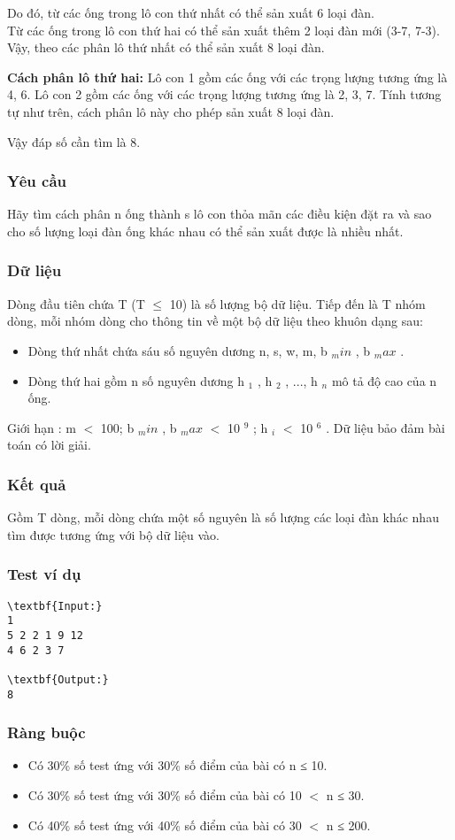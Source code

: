 Do đó, từ các ống trong lô con thứ nhất có thể sản xuất 6 loại đàn.
\\Từ các ống trong lô con thứ hai có thể sản xuất thêm 2 loại đàn mới (3-7, 7-3).
\\Vậy, theo các phân lô thứ nhất có thể sản xuất 8 loại đàn.

\textbf{Cách phân lô thứ hai: } Lô con 1 gồm các ống với các trọng lượng tương ứng là 4, 6. Lô con 2 gồm các ống với các trọng lượng tương ứng là 2, 3, 7. Tính tương tự như trên, cách phân lô này cho phép sản xuất 8 loại đàn.

Vậy đáp số cần tìm là 8.

\subsubsection{Yêu cầu}

Hãy tìm cách phân n ống thành s lô con thỏa mãn các điều kiện đặt ra và sao cho số lượng loại đàn ống khác nhau có thể sản xuất được là nhiều nhất.

\subsubsection{Dữ liệu}

Dòng đầu tiên chứa T (T $\le$ 10) là số lượng bộ dữ liệu. Tiếp đến là T nhóm dòng, mỗi nhóm dòng cho thông tin về một bộ dữ liệu theo khuôn dạng sau:
\begin{itemize}
	\item Dòng thứ nhất chứa sáu số nguyên dương n, s, w, m, b $_ min $ , b $_ max $ .
	\item Dòng thứ hai gồm n số nguyên dương h $_ 1 $ , h $_ 2 $ , ..., h $_ n $ mô tả độ cao của n ống.
\end{itemize}

Giới hạn : m $<$ 100; b $_ min $ , b $_ max $ $<$ 10 $^ 9 $ ; h $_ i $ $<$ 10 $^ 6 $ . Dữ liệu bảo đảm bài toán có lời giải.
\begin{itemize}
\end{itemize}

\subsubsection{Kết quả}

Gồm T dòng, mỗi dòng chứa một số nguyên là số lượng các loại đàn khác nhau tìm được tương ứng với bộ dữ liệu vào.

\subsubsection{Test ví dụ}
\begin{verbatim}
\textbf{Input:}
1
5 2 2 1 9 12
4 6 2 3 7

\textbf{Output:}
8\end{verbatim}

\subsubsection{Ràng buộc}
\begin{itemize}
	\item Có 30\% số test ứng với 30\% số điểm của bài có n ≤ 10.
	\item Có 30\% số test ứng với 30\% số điểm của bài có 10 $<$ n ≤ 30.
	\item Có 40\% số test ứng với 40\% số điểm của bài có 30 $<$ n ≤ 200.
\end{itemize}
